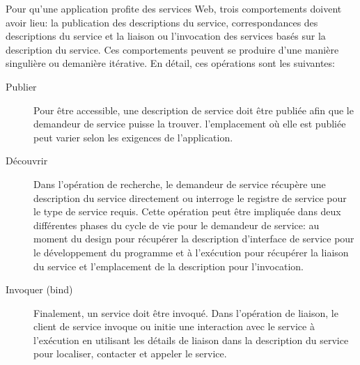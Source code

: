   Pour qu'une application profite des services Web, trois
  comportements doivent avoir lieu: la publication des descriptions
  du service, correspondances des descriptions du service et la
  liaison ou l'invocation des services basés sur la description du
  service. Ces comportements peuvent se produire d'une manière
  singulière ou demanière itérative. En détail, ces opérations sont
  les suivantes:

  \SpecialItem
  \begin{description}%
    \item[Publier] Pour être accessible, une description de service
      doit être publiée afin que le demandeur de service puisse la
      trouver. l'emplacement où elle est publiée peut varier selon les
      exigences de l'application.

    \item[Découvrir]
      Dans l'opération de recherche, le demandeur de service récupère
      une description du service directement ou interroge le registre
      de service pour le type de service requis. Cette opération peut
      être impliquée dans deux différentes phases du cycle de vie pour
      le demandeur de service: au moment du design pour récupérer la
      description d'interface de service pour le développement du
      programme et à l'exécution pour récupérer la liaison du service
      et l'emplacement de la description pour l'invocation.

    \item[Invoquer (bind)] Finalement, un service doit être invoqué. Dans
      l'opération de liaison, le client de service invoque ou initie
      une interaction avec le service à l'exécution en utilisant les
      détails de liaison dans la description du service pour
      localiser, contacter et appeler le service.
  \end{description}

